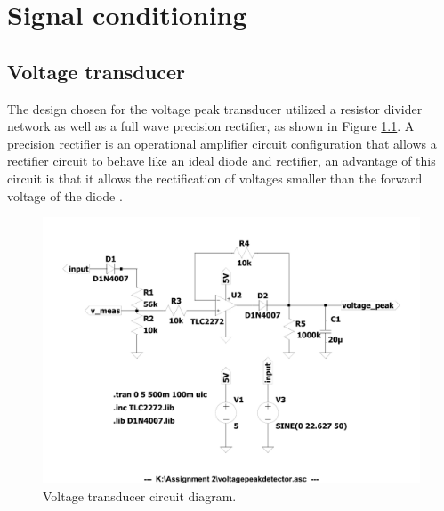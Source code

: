 \chapter{Signal conditioning} \label{sec:trans}

\section{Voltage transducer} \label{sec:vtrans}
The design chosen for the voltage peak transducer utilized a resistor divider network as well as a full wave precision rectifier, as shown in Figure \ref{fig:vtrans_circuit_diagram}. A precision rectifier is an operational amplifier circuit configuration that allows a rectifier circuit to behave like an ideal diode and rectifier, an advantage of this circuit is that it allows the rectification of voltages smaller than the forward voltage of the diode \cite{PrecisionRectifier}.
\begin{figure}[!ht]
  \centering
        \includegraphics[width=0.5\linewidth]{./Figures/vtrans_circuit_diagram.pdf}
		    \caption{Voltage transducer circuit diagram.} \label{fig:vtrans_circuit_diagram}
\end{figure}


